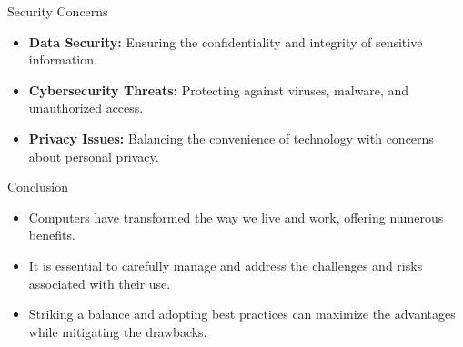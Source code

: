 \begin{frame}{Security Concerns}
  \begin{itemize}
    \item \textbf{Data Security:} Ensuring the confidentiality and integrity of sensitive information.
    \item \textbf{Cybersecurity Threats:} Protecting against viruses, malware, and unauthorized access.
    \item \textbf{Privacy Issues:} Balancing the convenience of technology with concerns about personal privacy.
  \end{itemize}
\end{frame}

\begin{frame}{Conclusion}
  \begin{itemize}
    \item Computers have transformed the way we live and work, offering numerous benefits.
    \item It is essential to carefully manage and address the challenges and risks associated with their use.
    \item Striking a balance and adopting best practices can maximize the advantages while mitigating the drawbacks.
  \end{itemize}
\end{frame}
